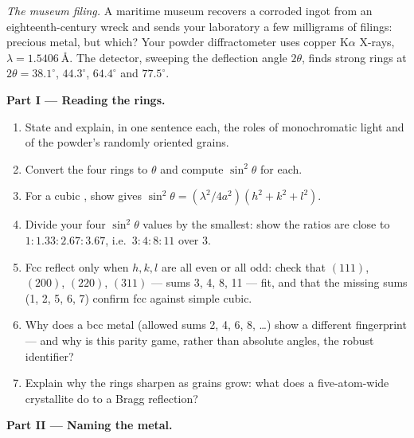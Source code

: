 \begin{problem}\label{pb:b3:crystalline-solids:1}
\emph{The museum filing.} A maritime museum recovers a corroded
ingot from an eighteenth-century wreck and sends your laboratory a
few milligrams of filings: precious metal, but which? Your powder
diffractometer uses copper K$\alpha$ X-rays,
$\lambda = \qty{1.5406}{\angstrom}$. The detector, sweeping the
deflection angle $2\theta$, finds strong rings at $2\theta =
38.1^\circ$, $44.3^\circ$, $64.4^\circ$ and $77.5^\circ$.

\medskip\noindent\textbf{Part I --- Reading the rings.}

\begin{enumerate}
  \item State  and explain, in one sentence each, the
        roles of monochromatic light and of the powder's randomly
        oriented grains.
  \item Convert the four rings to $\theta$ and compute
        $\sin^2\theta$ for each.
  \item For a cubic , show  gives
        $\sin^2\theta = (\lambda^2/4a^2)(h^2 + k^2 + l^2)$.
  \item Divide your four $\sin^2\theta$ values by the smallest:
        show the ratios are close to $1 : 1.33 : 2.67 : 3.67$,
        i.e.\ $3 : 4 : 8 : 11$ over 3.
  \item Fcc  reflect only when $h, k, l$ are all even or
        all odd: check that $(111)$, $(200)$, $(220)$, $(311)$ ---
        sums 3, 4, 8, 11 --- fit, and that the missing sums
        (1, 2, 5, 6, 7) confirm fcc against simple cubic.
  \item Why does a bcc metal (allowed sums 2, 4, 6, 8, \dots) show
        a different fingerprint --- and why is this parity game,
        rather than absolute angles, the robust identifier?
  \item Explain why the rings sharpen as grains grow: what does a
        five-atom-wide crystallite do to a Bragg reflection?
\end{enumerate}

\medskip\noindent\textbf{Part II --- Naming the metal.}


\end{problem}
